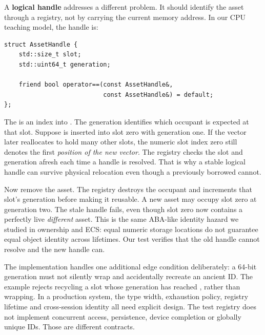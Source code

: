 A \textbf{logical handle} addresses a different problem. It should identify the asset through a registry, not by carrying the current memory address. In our CPU teaching model, the handle is:

\begin{verbatim}
struct AssetHandle {
    std::size_t slot;
    std::uint64_t generation;

    friend bool operator==(const AssetHandle&,
                           const AssetHandle&) = default;
};
\end{verbatim}

The  is an index into . The generation identifies which occupant is expected at that slot. Suppose  is inserted into slot zero with generation one. If the vector later reallocates to hold many other slots, the numeric slot index zero still denotes the first \emph{position of the new vector}. The registry checks the slot and generation afresh each time a handle is resolved. That is why a stable logical handle can survive physical relocation even though a previously borrowed  cannot.

Now remove the asset. The registry destroys the occupant and increments that slot's generation before making it reusable. A new asset may occupy slot zero at generation two. The stale handle  fails, even though slot zero now contains a perfectly live \emph{different} asset. This is the same ABA-like identity hazard we studied in ownership and ECS: equal numeric storage locations do not guarantee equal object identity across lifetimes. Our test verifies that the old handle cannot resolve and the new handle can.

The implementation handles one additional edge condition deliberately: a 64-bit generation must not silently wrap and accidentally recreate an ancient ID. The example rejects recycling a slot whose generation has reached , rather than wrapping. In a production system, the type width, exhaustion policy, registry lifetime and cross-session identity all need explicit design. The test registry does not implement concurrent access, persistence, device completion or globally unique IDs. Those are different contracts.

